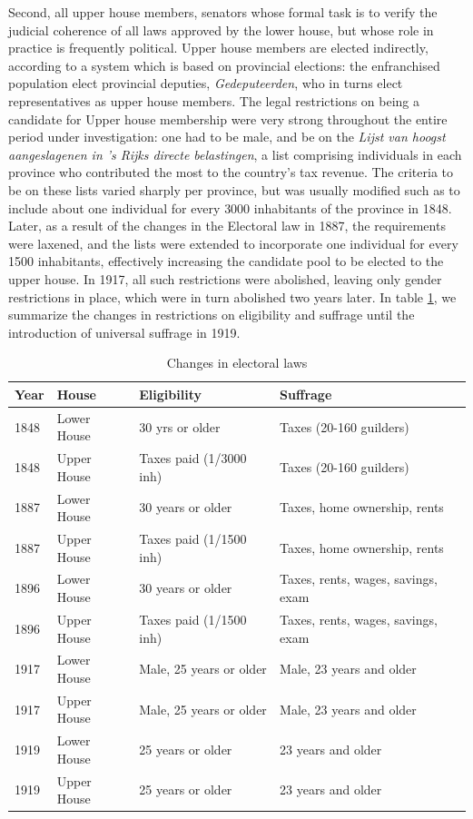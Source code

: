Second, all upper house members, senators whose formal task is to verify the judicial coherence of all laws approved by the lower house, but whose role in practice is frequently political.\autocite{van1999eerste} Upper house members are elected indirectly, according to a system which is based on provincial elections: the enfranchised population elect provincial deputies, \textit{Gedeputeerden}, who in turns elect representatives as upper house members. The legal restrictions on being a candidate for Upper house membership were very strong throughout the entire period under investigation: one had to be male, and be on the \textit{Lijst van hoogst aangeslagenen in 's Rijks directe belastingen}, a list comprising individuals in each province who contributed the most to the country's tax revenue. \autocite{moes1994lijsten} The criteria to be on these lists varied sharply per province, but was usually modified such as to include about one individual for every 3000 inhabitants of the province in 1848. \autocite{moes2012onder} Later, as a result of the changes in the Electoral law in 1887, the requirements were laxened, and the lists were extended to incorporate one individual for every 1500 inhabitants, effectively increasing the candidate pool to be elected to the upper house. In 1917, all such restrictions were abolished, leaving only gender restrictions in place, which were in turn abolished two years later. In table \ref{tab:upperhouselowerhouse}, we summarize the changes in restrictions on eligibility and suffrage until the introduction of universal suffrage in 1919. 

\begin{table}[!ht]
    \footnotesize
    \centering
    \begin{tabular}{llll}
        Year & House & Eligibility & Suffrage  \\ \hline
        1848 & Lower House & 30 yrs or older & Taxes (20-160 guilders) \\
        1848 & Upper House & Taxes paid (1/3000 inh) & Taxes (20-160 guilders) \\
        1887 & Lower House & 30 years or older & Taxes, home ownership, rents \\
        1887 & Upper House & Taxes paid (1/1500 inh) & Taxes, home ownership, rents \\
        1896 & Lower House & 30 years or older & Taxes, rents, wages, savings, exam \\
        1896 & Upper House & Taxes paid (1/1500 inh) & Taxes, rents, wages, savings, exam \\
        1917 & Lower House & Male, 25 years or older & Male, 23 years and older \\
        1917 & Upper House & Male, 25 years or older  & Male, 23 years and older \\
        1919 & Lower House & 25 years or older & 23 years and older \\
        1919 & Upper House & 25 years or older & 23 years and older \\ \hline
    \end{tabular}
    \caption{Changes in electoral laws}
    \label{tab:upperhouselowerhouse}
\end{table}

